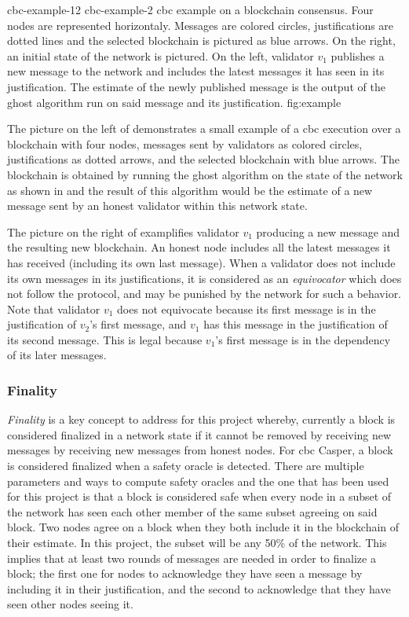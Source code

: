 \doublefigure
    {cbc-example-12}
    {cbc-example-2}
    {\gls{cbc} example on a blockchain consensus.%
    Four nodes are represented horizontaly. Messages are colored circles,
    justifications are dotted lines and the selected blockchain is pictured as
    blue arrows.%
    On the right, an initial state of the network is pictured. %
    On the left, validator \(v_1\) publishes a new message to the network and
    includes the latest messages it has seen in its justification. The estimate
    of the newly published message is the output of the \gls{ghost} algorithm
    run on said message and its justification.
    }
    {fig:example}

The picture on the left of  demonstrates a small example of a
\gls{cbc} execution over a blockchain with four nodes, messages sent by
validators as colored circles, justifications as dotted arrows, and the selected
blockchain with blue arrows.  The blockchain is obtained by running the
\gls{ghost} algorithm on the state of the network as shown in 
and the result of this algorithm would be the estimate of a new message sent by
an honest validator within this network state. 

The picture on the right of  examplifies validator \(v_1\)
producing a new message and the resulting new blockchain. An honest node
includes all the latest messages it has received (including its own last
message).  When a validator does not include its own messages in its
justifications, it is considered as an \textit{equivocator} which does not
follow the protocol, and may be punished by the network for such a behavior.
Note that validator \(v_1\) does not equivocate because its first message is in
the justification of \(v_2\)'s first message, and \(v_1\) has this message in
the justification of its second message. This is legal because \(v_1\)'s first
message is in the dependency of its later messages.

\subsubsection{Finality}
\label{ssec:finality}
\textit{Finality} is a key concept to address for this project whereby,
currently a block is considered finalized in a network state if it cannot be
removed by receiving new messages by receiving new messages from honest nodes.
For \gls{cbc} Casper, a block is considered finalized when a safety oracle is
detected. There are multiple parameters and ways to compute safety oracles and
the one that has been used for this project is that a block is considered safe
when every node in a subset of the network has seen each other member of the
same subset agreeing on said block. Two nodes agree on a block when they both
include it in the blockchain of their estimate. In this project, the subset will
be any 50\% of the network. This implies that at least two rounds of messages
are needed in order to finalize a block; the first one for nodes to acknowledge
they have seen a message by including it in their justification, and the second
to acknowledge that they have seen other nodes seeing it.


